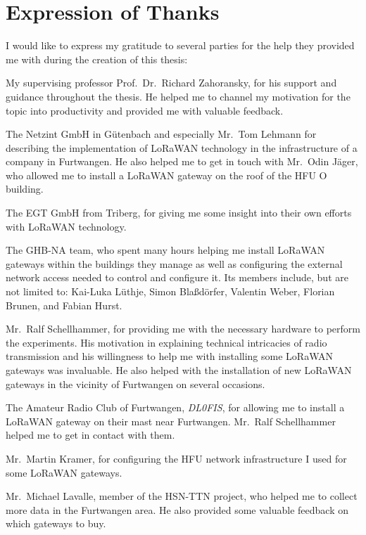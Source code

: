 
\section{Expression of Thanks}\label{sec:expression-of-thanks}

I would like to express my gratitude to several parties for the help they provided me with during the creation of this thesis:

My supervising professor Prof.\ Dr.\ Richard Zahoransky, for his support and guidance throughout the thesis.
He helped me to channel my motivation for the topic into productivity and provided me with valuable feedback.

The Netzint GmbH in Gütenbach and especially Mr.\ Tom Lehmann for describing the implementation of \ac{LoRaWAN} technology in the infrastructure of a company in Furtwangen.
He also helped me to get in touch with Mr.\ Odin Jäger, who allowed me to install a \ac{LoRaWAN} gateway on the roof of the \ac{HFU} O building.

The EGT GmbH from Triberg, for giving me some insight into their own efforts with \ac{LoRaWAN} technology.

The \acl{GHB-NA} team, who spent many hours helping me install \ac{LoRaWAN} gateways within the buildings they manage as well as configuring the external network access needed to control and configure it.
Its members include, but are not limited to: Kai-Luka Lüthje, Simon Blaßdörfer, Valentin Weber, Florian Brunen, and Fabian Hurst.

Mr.\ Ralf Schellhammer, for providing me with the necessary hardware to perform the experiments.
His motivation in explaining technical intricacies of radio transmission and his willingness to help me with installing some \ac{LoRaWAN} gateways was invaluable.
He also helped with the installation of new \ac{LoRaWAN} gateways in the vicinity of Furtwangen on several occasions.

The Amateur Radio Club of Furtwangen, \emph{DL0FIS}, for allowing me to install a \ac{LoRaWAN} gateway on their mast near Furtwangen.
Mr.\ Ralf Schellhammer helped me to get in contact with them.

Mr.\ Martin Kramer, for configuring the \ac{HFU} network infrastructure I used for some \ac{LoRaWAN} gateways.

Mr.\ Michael Lavalle, member of the \ac{HSN-TTN} project, who helped me to collect more data in the Furtwangen area.
He also provided some valuable feedback on which gateways to buy.

